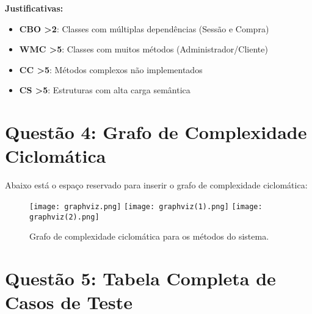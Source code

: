 \documentclass{article}
\begin{document}
\textbf{Justificativas:}
\begin{itemize}
\item \textbf{CBO \textgreater 2}: Classes com múltiplas dependências (Sessão e Compra)
\item \textbf{WMC \textgreater 5}: Classes com muitos métodos (Administrador/Cliente)
\item \textbf{CC \textgreater 5}: Métodos complexos não implementados
\item \textbf{CS \textgreater 5}: Estruturas com alta carga semântica
\end{itemize}

\section*{Questão 4: Grafo de Complexidade Ciclomática}

Abaixo está o espaço reservado para inserir o grafo de complexidade ciclomática:

\begin{figure}[H] %
\centering
\texttt{[image: graphviz.png]}
\texttt{[image: graphviz(1).png]}
\texttt{[image: graphviz(2).png]}
\caption{Grafo de complexidade ciclomática para os métodos do sistema.}
\end{figure}

\section*{Questão 5: Tabela Completa de Casos de Teste}
\end{document}
